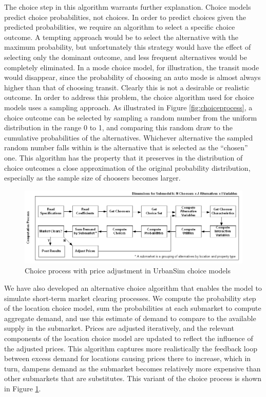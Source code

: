 The choice step in this algorithm warrants further explanation. Choice models predict choice probabilities, not choices. In order to predict choices given the predicted probabilities, we require an algorithm to select a specific choice outcome. A tempting approach would be to select the alternative with the maximum probability, but unfortunately this strategy would have the effect of selecting only the dominant outcome, and less frequent alternatives would be completely eliminated. In a mode choice model, for illustration, the transit mode would disappear, since the probability of choosing an auto mode is almost always higher than that of choosing transit. Clearly this is not a desirable or realistic outcome. In order to address this problem, the choice algorithm used for choice models uses a sampling approach. As illustrated in Figure \ref{fig:choiceprocess}, a choice outcome can be selected by sampling a random number from the uniform distribution in the range 0 to 1, and comparing this random draw to the cumulative probabilities of the alternatives. Whichever alternative the sampled random number falls within is the alternative that is selected as the \enquote{chosen} one. This algorithm has the property that it preserves in the distribution of choice outcomes a close approximation of the original probability distribution, especially as the sample size of choosers becomes larger.

\begin{figure}[htbp]
    \center
    \includegraphics[width=\textwidth]
    {graphics/ChoiceProcessWithPriceAdjustment.png}
    \caption{Choice process with price adjustment in UrbanSim choice models}
    \label{fig:choiceprocesswithprice}
\end{figure}

We have also developed an alternative choice algorithm that enables the model to simulate short-term market clearing
processes. We compute the probability step of the location choice model, sum the probabilities at each submarket to compute
aggregate demand, and use this estimate of demand to compare to the available supply in the submarket. Prices are adjusted
iteratively, and the relevant components of the location choice model are updated to reflect the influence of the adjusted
prices. This algorithm captures more realistically the feedback loop between excess demand for locations causing prices there
to increase, which in turn, dampens demand as the submarket becomes relatively more expensive than other submarkets that
are substitutes. This variant of the choice process is shown in Figure \ref{fig:choiceprocesswithprice}.


